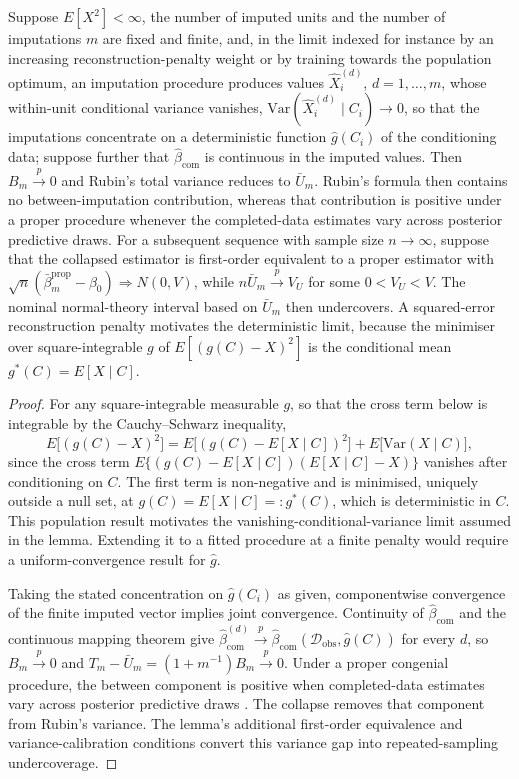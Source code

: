 \begin{lemma}\label{lemma:mean-collapse}
Suppose $E[X^2]<\infty$, the number of imputed units and the number of imputations $m$ are fixed and finite, and, in the limit indexed for instance by an increasing reconstruction-penalty weight or by training towards the population optimum, an imputation procedure produces values $\hat{X}_i^{(d)}$, $d=1,\dots,m$, whose within-unit conditional variance vanishes, $\mathrm{Var}(\hat{X}_i^{(d)}\mid C_i)\to0$, so that the imputations concentrate on a deterministic function $\hat{g}(C_i)$ of the conditioning data; suppose further that $\hat{\beta}_{\mathrm{com}}$ is continuous in the imputed values. Then $B_m\xrightarrow{p}0$ and Rubin's total variance reduces to $\bar{U}_m$. Rubin's formula then contains no between-imputation contribution, whereas that contribution is positive under a proper procedure whenever the completed-data estimates vary across posterior predictive draws. For a subsequent sequence with sample size $n\to\infty$, suppose that the collapsed estimator is first-order equivalent to a proper estimator with $\sqrt n(\bar\beta_m^{\mathrm{prop}}-\beta_0)\Rightarrow N(0,V)$, while $n\bar U_m\xrightarrow{p}V_U$ for some $0<V_U<V$. The nominal normal-theory interval based on $\bar U_m$ then undercovers. A squared-error reconstruction penalty motivates the deterministic limit, because the minimiser over square-integrable $g$ of $E[(g(C)-X)^2]$ is the conditional mean $g^{*}(C)=E[X\mid C]$.
\end{lemma}

\begin{proof}
For any square-integrable measurable $g$, so that the cross term below is integrable by the Cauchy--Schwarz inequality,
\[
E\bigl[(g(C)-X)^2\bigr]=E\bigl[(g(C)-E[X\mid C])^2\bigr]+E\bigl[\mathrm{Var}(X\mid C)\bigr],
\]
    since the cross term $E\{(g(C)-E[X\mid C])(E[X\mid C]-X)\}$ vanishes after conditioning on $C$. The first term is non-negative and is minimised, uniquely outside a null set, at $g(C)=E[X\mid C]=:g^{*}(C)$, which is deterministic in $C$. This population result motivates the vanishing-conditional-variance limit assumed in the lemma. Extending it to a fitted procedure at a finite penalty would require a uniform-convergence result for $\hat{g}$.

Taking the stated concentration on $\hat{g}(C_i)$ as given, componentwise convergence of the finite imputed vector implies joint convergence. Continuity of $\hat{\beta}_{\mathrm{com}}$ and the continuous mapping theorem give $\hat{\beta}^{(d)}_{\mathrm{com}}\xrightarrow{p}\hat{\beta}_{\mathrm{com}}(\mathcal{D}_{\mathrm{obs}},\hat{g}(C))$ for every $d$, so $B_m\xrightarrow{p}0$ and $T_m-\bar{U}_m=(1+m^{-1})B_m\xrightarrow{p}0$. Under a proper congenial procedure, the between component is positive when completed-data estimates vary across posterior predictive draws \citep{meng1994multiple}. The collapse removes that component from Rubin's variance. The lemma's additional first-order equivalence and variance-calibration conditions convert this variance gap into repeated-sampling undercoverage.
\end{proof}

